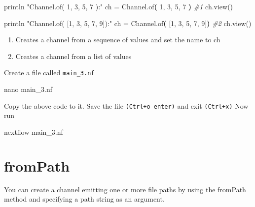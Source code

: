 \documentclass[
]{book}
\newenvironment{Shaded}{\begin{snugshade}}{\end{snugshade}}
\newcommand{\CommentTok}[1]{\textcolor[rgb]{0.56,0.35,0.01}{\textit{#1}}}
\newcommand{\ErrorTok}[1]{\textcolor[rgb]{0.64,0.00,0.00}{\textbf{#1}}}
\newcommand{\ExtensionTok}[1]{#1}
\newcommand{\FunctionTok}[1]{\textcolor[rgb]{0.00,0.00,0.00}{#1}}
\newcommand{\KeywordTok}[1]{\textcolor[rgb]{0.13,0.29,0.53}{\textbf{#1}}}
\newcommand{\NormalTok}[1]{#1}
\newcommand{\StringTok}[1]{\textcolor[rgb]{0.31,0.60,0.02}{#1}}
\providecommand{\tightlist}{%
  \setlength{\itemsep}{0pt}\setlength{\parskip}{0pt}}
\begin{document}
\begin{Shaded}
\begin{Highlighting}[numbers=left,,]
\ExtensionTok{println} \StringTok{"Channel.of( 1, 3, 5, 7 ):"}
\ExtensionTok{ch}\NormalTok{ = Channel.of}\ErrorTok{(} \ExtensionTok{1,}\NormalTok{ 3, 5, 7 }\KeywordTok{)} \CommentTok{\#1 }
\FunctionTok{ch.view()}

\ExtensionTok{println} \StringTok{"Channel.of( [1, 3, 5, 7, 9]):"}
\ExtensionTok{ch}\NormalTok{ = Channel.of}\ErrorTok{(} \ExtensionTok{[1,}\NormalTok{ 3, 5, 7, 9]}\KeywordTok{)} \CommentTok{\#2}
\FunctionTok{ch.view()}
\end{Highlighting}
\end{Shaded}

\begin{enumerate}
\def\labelenumi{\arabic{enumi}.}
\tightlist
\item
  Creates a channel from a sequence of values and set the name to ch
\item
  Creates a channel from a list of values
\end{enumerate}

Create a file called \texttt{main\_3.nf}

\begin{Shaded}
\begin{Highlighting}[numbers=left,,]
\FunctionTok{nano}\NormalTok{ main\_3.nf}
\end{Highlighting}
\end{Shaded}

Copy the above code to it. Save the file \texttt{(Ctrl+o\ enter)} and exit \texttt{(Ctrl+x)}
Now run

\begin{Shaded}
\begin{Highlighting}[numbers=left,,]
\ExtensionTok{nextflow}\NormalTok{ main\_3.nf}
\end{Highlighting}
\end{Shaded}

\hypertarget{frompath}{%
\section{fromPath}\label{frompath}}

You can create a channel emitting one or more file paths by using the fromPath method and specifying a path string as an argument.
\end{document}
